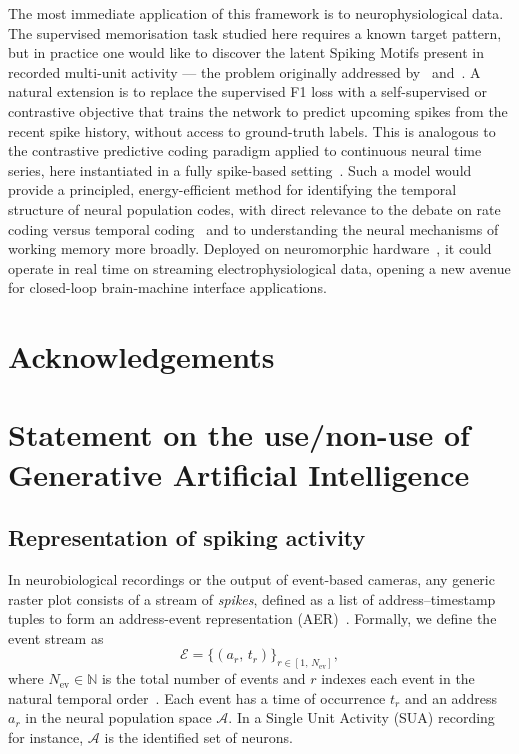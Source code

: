 \documentclass{scrartcl}
\newcommand{\citep}[1]{\parencite{#1}}
\newcommand{\citet}[1]{\textcite{#1}}
\begin{document}
The most immediate application of this framework is to neurophysiological data. The supervised memorisation task studied here requires a known target pattern, but in practice one would like to discover the latent Spiking Motifs present in recorded multi-unit activity --- the problem originally addressed by~\citet{Ikegaya2004} and~\citet{Villette2015}. A natural extension is to replace the supervised F1 loss with a self-supervised or contrastive objective that trains the network to predict upcoming spikes from the recent spike history, without access to ground-truth labels. This is analogous to the contrastive predictive coding paradigm applied to continuous neural time series, here instantiated in a fully spike-based setting~\citep{Grimaldi2023}. Such a model would provide a principled, energy-efficient method for identifying the temporal structure of neural population codes, with direct relevance to the debate on rate coding versus temporal coding~\citep{Softky1993,Bohte2004} and to understanding the neural mechanisms of working memory more broadly. Deployed on neuromorphic hardware~\citep{Goltz2021,Eshraghian2023}, it could operate in real time on streaming electrophysiological data, opening a new avenue for closed-loop brain-machine interface applications.
%
\section*{Acknowledgements}
\noindent \Acknowledgements
\section*{Statement on the use/non-use of Generative Artificial Intelligence}
\noindent \AIstatement
\appendix


\subsection{Representation of spiking activity}

In neurobiological recordings or the output of event-based cameras, any generic raster plot consists of a stream of \emph{spikes}, defined as a list of address--timestamp tuples to form an address-event representation (AER)~\citep{Grimaldi2024}. Formally, we define the event stream as
\[
  \mathcal{E}
  = \bigl\{(a_r,\, t_r)\bigr\}_{r \in [1,\, N_\mathrm{ev}]},
\]
where $N_\mathrm{ev} \in \mathbb{N}$ is the total number of events and $r$ indexes each event in the natural temporal order~\citep{Grimaldi2024}. Each event has a time of occurrence $t_r$ and an address $a_r$ in the neural population space $\mathcal{A}$. In a Single Unit Activity (SUA) recording for instance, $\mathcal{A}$ is the identified set of neurons.
\end{document}
